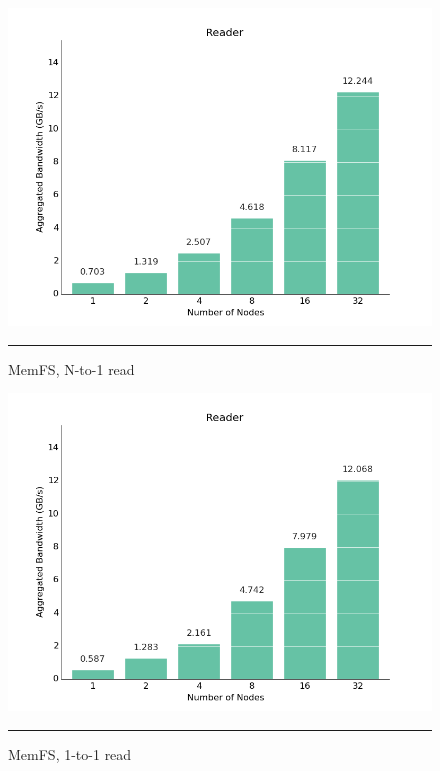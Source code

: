 \begin{figure}[H]
  \centering
    \includegraphics[scale=0.6]{Figures/memfs_32_1_to_1.png}
    \rule{25em}{0.5pt}
  \caption[AMFS, N-to-1 read]{MemFS, N-to-1 read}
  \label{fig:plot3}
\end{figure}

\begin{figure}[H]
  \centering
    \includegraphics[scale=0.6]{Figures/memfs_32_N_to_1.png}
    \rule{25em}{0.5pt}
  \caption[AMFS, N-to-1 read]{MemFS, 1-to-1 read}
  \label{fig:plot4}
\end{figure}

